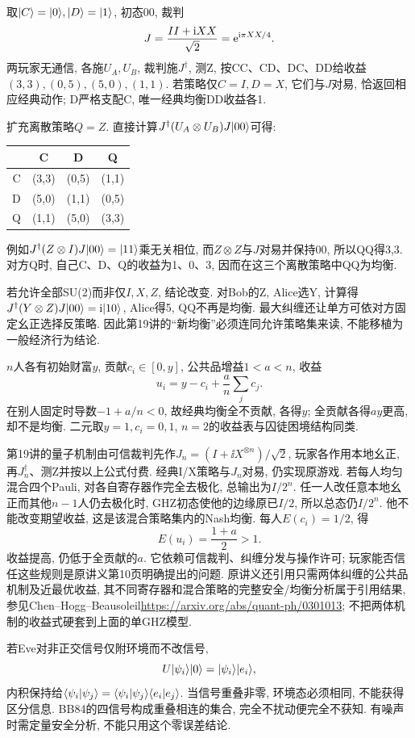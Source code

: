 取$\lvert C\rangle=\lvert 0\rangle,\lvert D\rangle=\lvert 1\rangle$, 初态00, 裁判
\[J=\frac{II+\mathrm i XX}{\sqrt2}=\mathrm e^{\mathrm i\pi XX/4}.\]
两玩家无通信, 各施$U_A,U_B$, 裁判施$J^\dagger$, 测Z, 按CC、CD、DC、DD给收益$(3,3),(0,5),(5,0),(1,1)$. 若策略仅$C=I,D=X$, 它们与$J$对易, 恰返回相应经典动作; D严格支配C, 唯一经典均衡DD收益各1.

扩充离散策略$Q=Z$. 直接计算$J^\dagger(U_A\otimes U_B)J\lvert 00\rangle$可得:
\begin{center}\begin{tabular}{c|ccc}
 &C&D&Q\\\hline
 C&(3,3)&(0,5)&(1,1)\\
 D&(5,0)&(1,1)&(0,5)\\
 Q&(1,1)&(5,0)&(3,3)
\end{tabular}\end{center}
例如$J^\dagger(Z\otimes I)J\lvert 00\rangle=\lvert 11\rangle$乘无关相位, 而$Z\otimes Z$与$J$对易并保持00, 所以QQ得3,3. 对方Q时, 自己C、D、Q的收益为1、0、3, 因而在这三个离散策略中QQ为均衡.

若允许全部SU(2)而非仅$I,X,Z$, 结论改变. 对Bob的Z, Alice选Y, 计算得$J^\dagger(Y\otimes Z)J\lvert 00\rangle=\mathrm i\lvert 10\rangle$, Alice得5, QQ不再是均衡. 最大纠缠还让单方可依对方固定幺正选择反策略. 因此第19讲的“新均衡”必须连同允许策略集来读, 不能移植为一般经济行为结论.

$n$人各有初始财富$y$, 贡献$c_i\in[0,y]$, 公共品增益$1<a<n$, 收益
\[u_i=y-c_i+\frac an\sum_jc_j.\]
在别人固定时导数$-1+a/n<0$, 故经典均衡全不贡献, 各得$y$; 全贡献各得$ay$更高, 却不是均衡. 二元取$y=1,c_i=0,1$, $n=2$的收益表与囚徒困境结构同类.

第19讲的量子机制由可信裁判先作$J_n=(I+\ii X^{\otimes n})/\sqrt2$, 玩家各作用本地幺正, 再$J_n^\dagger$、测Z并按以上公式付费. 经典I/X策略与$J_n$对易, 仍实现原游戏. 若每人均匀混合四个Pauli, 对各自寄存器作完全去极化, 总输出为$I/2^n$. 任一人改任意本地幺正而其他$n-1$人仍去极化时, GHZ初态使他的边缘原已$I/2$, 所以总态仍$I/2^n$. 他不能改变期望收益, 这是该混合策略集内的Nash均衡. 每人$E(c_i)=1/2$, 得
\[E(u_i)=\frac{1+a}{2}>1.\]
收益提高, 仍低于全贡献的$a$. 它依赖可信裁判、纠缠分发与操作许可; 玩家能否信任这些规则是原讲义第10页明确提出的问题. 原讲义还引用只需两体纠缠的公共品机制及近最优收益, 其不同寄存器和混合策略的完整安全/均衡分析属于引用结果, 参见Chen--Hogg--Beausoleil\url{https://arxiv.org/abs/quant-ph/0301013}; 不把两体机制的收益式硬套到上面的单GHZ模型.

若Eve对非正交信号仅附环境而不改信号,
\[U\lvert \psi_i\rangle\lvert 0\rangle=\lvert \psi_i\rangle\lvert e_i\rangle,\]
内积保持给$\langle \psi_i\vert \psi_j\rangle=\langle \psi_i\vert \psi_j\rangle\langle e_i\vert e_j\rangle$. 当信号重叠非零, 环境态必须相同, 不能获得区分信息. BB84的四信号构成重叠相连的集合, 完全不扰动便完全不获知. 有噪声时需定量安全分析, 不能只用这个零误差结论.


